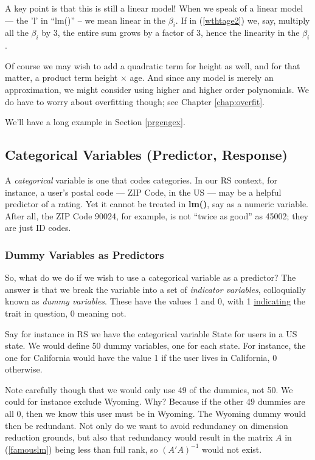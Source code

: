 A key point is that this is still a linear model! When we speak of a
linear model --- the 'l' in ``lm()'' -- we mean linear in the $\beta_i$.
If in (\ref{wthtage2}) we, say, multiply all the $\beta_i$ by 3, the
entire sum grows by a factor of 3, hence the linearity in the $\beta_i$.

Of course we may wish to add a quadratic term for height as well, and
for that matter, a product term height $\times$ age.  And since any
model is merely an approximation, we might consider using higher and
higher order polynomials.  We do have to worry about overfitting though;
see Chapter \ref{chap:overfit}.

We'll have a long example in Section \ref{prgengex}.

\subsection{Categorical Variables (Predictor, Response)}

A \textit{categorical} variable is one that codes categories.  In our RS
context, for instance, a user's postal code --- ZIP Code, in the US ---
may be a helpful predictor of a rating.  Yet it cannot be treated in
\textbf{lm()}, say as a numeric variable.  After all, the ZIP Code
90024, for example, is not ``twice as good'' as 45002; they are just ID
codes.

\subsubsection{Dummy Variables as Predictors}

So, what do we do if we wish to use a categorical variable as a
predictor?  The answer is that we break the variable into a set of
\textit{indicator variables}, colloquially known as \textit{dummy
variables}.  These have the values 1 and 0, with 1
\underline{indicating} the trait in question, 0 meaning not.

Say for instance in RS we have the categorical variable State for users
in a US state.  We would define 50 dummy variables, one for each state.
For instance, the one for California would have the value 1 if the user
lives in California, 0 otherwise.

Note carefully though that we would only use 49 of the dummies, not 50.
We could for instance exclude Wyoming.  Why? Because if the other 49
dummies are all 0, then we know this user must be in Wyoming.  The
Wyoming dummy would then be redundant. Not only do we want to avoid
redundancy on dimension reduction grounds, but also that redundancy
would result in the matrix $A$ in (\ref{famouslm}) being less than full
rank, so $(A'A)^{-1}$ would not exist.

